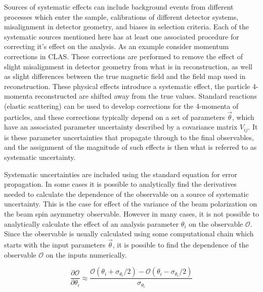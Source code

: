 Sources of systematic effects can include background events from different processes which enter the sample, calibrations of different detector systems, misalignment in detector geometry, and biases in selection criteria.  Each of the systematic sources mentioned here has at least one associated procedure for correcting it's effect on the analysis.  As an example consider momentum corrections in CLAS.  These corrections are performed to remove the effect of slight misalignment in detector geometry from what is in reconstruction, as well as slight differences between the true magnetic field and the field map used in reconstruction.  These physical effects introduce a systematic effect, the particle 4-momenta reconstructed are shifted away from the true values.  Standard reactions (elastic scattering) can be used to develop corrections for the 4-momenta of particles, and these corrections typically depend on a set of parameters $\vec{\theta}$, which have an associated parameter uncertainty described by a covariance matrix $V_{ij}$.  It is these parameter uncertainties that propagate through to the final observables, and the assignment of the magnitude of such effects is then what is referred to as systematic uncertainty. \\


Systematic uncertainties are included using the standard equation for error propagation.  In some cases it is possible to analytically find the derivatives needed to calculate the dependence of the observable on a source of systematic uncertainty.  This is the case for effect of the variance of the beam polarization on the beam spin asymmetry observable.  However in many cases, it is not possible to analytically calculate the effect of an analysis parameter $\theta_i$ on the observable $\mathcal{O}$.  Since the observable is usually calculated using some computational chain which starts with the input parameters $\vec{\theta}$, it is possible to find the dependence of the observable $\mathcal{O}$ on the inputs numerically.

\begin{equation}
  \frac{\partial \mathcal{O}}{ \partial \theta_i} \approx \frac{\mathcal{O}(\theta_i + \sigma_{\theta_i}/2) - \mathcal{O}(\theta_i - \sigma_{\theta_i}/2)}{\sigma_{\theta_i}}
\end{equation}


